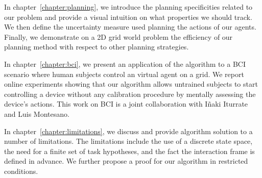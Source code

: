 In chapter~\ref{chapter:planning}, we introduce the planning specificities related to our problem and provide a visual intuition on what properties we should track. We then define the uncertainty measure used planning the actions of our agents. Finally, we demonstrate on a 2D grid world problem the efficiency of our planning method with respect to other planning strategies.

In chapter~\ref{chapter:bci}, we present an application of the algorithm to a BCI scenario where  human subjects control an virtual agent on a grid. We report online experiments showing that our algorithm allows untrained subjects to start controlling a device without any calibration procedure by mentally assessing the device's actions. This work on BCI is a joint collaboration with I{\~n}aki Iturrate and Luis Montesano.

In chapter~\ref{chapter:limitations}, we discuss and provide algorithm solution to a number of limitations. The limitations include the use of a discrete state space, the need for a finite set of task hypotheses, and the fact the interaction frame is defined in advance. We further propose a proof for our algorithm in restricted conditions.

